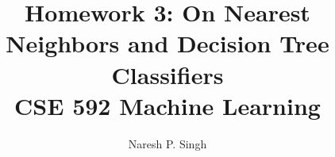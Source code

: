 \documentclass[]{article}   %
\begin{document}
\title{Homework 3: On Nearest Neighbors and Decision Tree Classifiers \\CSE 592 Machine Learning}   %
\author{Naresh P. Singh}         %
\maketitle

\renewcommand{\thesubfigure}{\thefigure.\arabic{subfigure}} 
\end{document}
